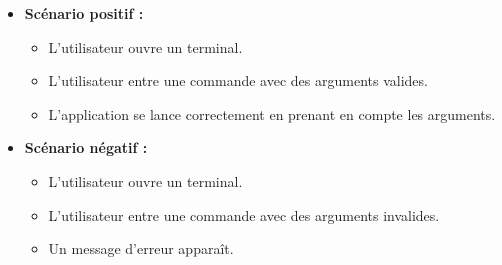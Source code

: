 \documentclass{article}
\begin{document}
\begin{enumerate}
\begin{itemize}
        \item \textbf{Scénario positif :}
        \begin{itemize}
            \item L’utilisateur ouvre un terminal.
            \item L’utilisateur entre une commande avec des arguments valides.
            \item L'application se lance correctement en prenant en compte les arguments.
        \end{itemize}
        \item \textbf{Scénario négatif :}
        \begin{itemize}
            \item L’utilisateur ouvre un terminal.
            \item L’utilisateur entre une commande avec des arguments invalides.
            \item Un message d'erreur apparaît.
        \end{itemize}
    \end{itemize}
    

\end{enumerate}
\end{document}
